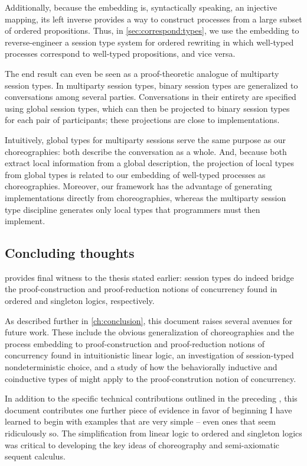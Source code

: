 Additionally, because the embedding is, syntactically speaking, an injective mapping, its left inverse provides a way to construct processes from a large subset of ordered propositions.
Thus, in \cref{sec:correspond:types}, we use the embedding to reverse-engineer a session type system for ordered rewriting in which well-typed processes correspond to well-typed propositions, and vice versa.

The end result can even be seen as a proof-theoretic analogue of multiparty session types.\autocite{Honda+:POPL08}
In multiparty session types, binary session types are generalized to conversations among several parties.
Conversations in their entirety are specified using global session types, which can then be projected to binary session types for each pair of participants; these projections are close to implementations.

Intuitively, global types for multiparty sessions serve the same purpose as our choreographies: both describe the conversation as a whole.
And, because both extract local information from a global description, the projection of local types from global types is related to our embedding of well-typed processes as choreographies.
Moreover, our framework has the advantage of generating implementations directly from choreographies, whereas the multiparty session type discipline generates only local types that programmers must then implement.


\subsection{Concluding thoughts}

 provides final witness to the thesis stated earlier:
session types do indeed bridge the proof-construction and proof-reduction notions of concurrency found in ordered and singleton logics, respectively.

As described further in \cref{ch:conclusion}, this document raises several avenues for future work.
These include the obvious generalization of choreographies and the process embedding to proof-construction and proof-reduction notions of concurrency found in intuitionistic linear logic, an investigation of session-typed nondeterministic choice, and a study of how the behaviorally inductive and coinductive types of \textcite{Derakhshan+Pfenning:LMCS20} might apply to the proof-constrution notion of concurrency.


In addition to the specific technical contributions outlined in the preceding , this document contributes one further piece of evidence in favor of beginning 
I have learned to begin with examples that are very simple -- even ones that seem ridiculously so.
The simplification from linear logic to ordered and singleton logics was critical to developing the key ideas of choreography and semi-axiomatic sequent calculus.



